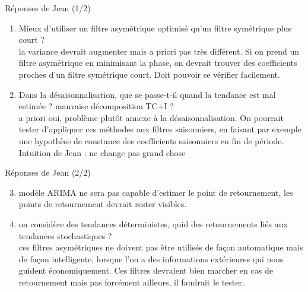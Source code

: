\documentclass[10pt,xcolor=table,color={dvipsnames,usenames},ignorenonframetext,usepdftitle=false,french]{beamer}
\begin{document}
\begin{frame}{Réponses de Jean (1/2)}
\protect\hypertarget{ruxe9ponses-de-jean-12}{}

\begin{enumerate}
\item
  Mieux d'utiliser un filtre asymétrique optimisé qu'un filtre
  symétrique plus court ?\\
  \faArrowCircleRight{} la variance devrait augmenter mais a priori pas
  très différent. Si on prend un filtre asymétrique en minimisant la
  phase, on devrait trouver des coefficients proches d'un filtre
  symétrique court. Doit pouvoir se vérifier facilement.
\item
  Dans la désaisonnalisation, que se passe-t-il quand la tendance est
  mal estimée ? mauvaise décomposition TC+I ?\\
  \faArrowCircleRight{} a priori oui, problème plutôt annexe à la
  désaisonnalisation. On pourrait tester d'appliquer ces méthodes aux
  filtres saisonniers, en faisant par exemple une hypothèse de constance
  des coefficients saisonniers en fin de période.\\
  Intuition de Jean : ne change pas grand chose
\end{enumerate}

\end{frame}

\begin{frame}{Réponses de Jean (2/2)}
\protect\hypertarget{ruxe9ponses-de-jean-22}{}

\begin{enumerate}
\setcounter{enumi}{2}
\item
  \faArrowCircleRight{} modèle ARIMA ne sera pas capable d'estimer le
  point de retournement, les points de retournement devrait rester
  visibles.
\item
  on considère des tendances déterministes, quid des retournements liés
  aux tendances stochastiques ?\\
  \faArrowCircleRight{} ces filtres asymétriques ne doivent pas être
  utilisés de façon automatique mais de façon intelligente, lorsque l'on
  a des informations extérieures qui nous guident économiquement. Ces
  filtres devraient bien marcher en cas de retournement mais pas
  forcément ailleurs, il faudrait le tester.
\end{enumerate}

\end{frame}
\end{document}
